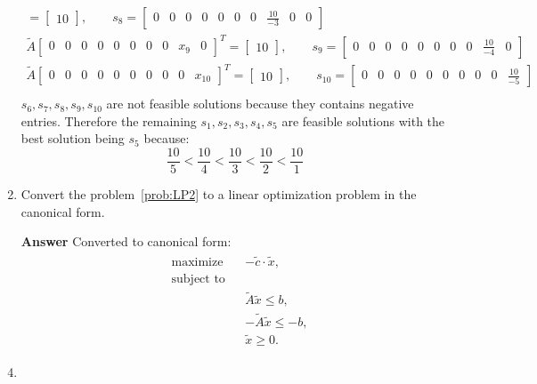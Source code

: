 \documentclass[10pt,a4paper]{article}
\theoremstyle{plain}
\theoremstyle{definition}
\begin{document}
\begin{enumerate}
\begin{align*}
  		=
  		\begin{bmatrix}10\end{bmatrix},\qquad s_8=\begin{bmatrix}
  			0 & 0 & 0 & 0 & 0 & 0 & 0 & \frac{10}{-3} & 0 & 0
  		\end{bmatrix} \\
  		\tilde{A}
  		\begin{bmatrix}
  			0 & 0 & 0 & 0 & 0 & 0 & 0 & 0 & x_9 & 0
  		\end{bmatrix}^T
  		=
  		\begin{bmatrix}10\end{bmatrix},\qquad s_9=\begin{bmatrix}
  			0 & 0 & 0 & 0 & 0 & 0 & 0 & 0 & \frac{10}{-4} & 0
  		\end{bmatrix} \\
  		\tilde{A}
  		\begin{bmatrix}
  			0 & 0 & 0 & 0 & 0 & 0 & 0 & 0 & 0 & x_{10}
  		\end{bmatrix}^T
  		=
  		\begin{bmatrix}10\end{bmatrix},\qquad s_{10}=\begin{bmatrix}
  			0 & 0 & 0 & 0 & 0 & 0 & 0 & 0 & 0 & \frac{10}{-5}
  		\end{bmatrix} \\
  \end{align*}
  $s_6, s_7, s_8, s_9, s_{10}$ are not feasible solutions because they contains negative entries. Therefore the remaining $s_1, s_2, s_3, s_4, s_5$ are feasible solutions with the best solution being $s_5$ because: \[\frac{10}{5} < \frac{10}{4} < \frac{10}{3} < \frac{10}{2} < \frac{10}{1}\]
\item\label{spm:canonic}
Convert the problem~\eqref{prob:LP2} to a linear optimization problem in the canonical form.
\item[\textbf{Answer}] Converted to canonical form:
\begin{align*}
  \begin{aligned}
    &\text{maximize} && -\tilde{c}\cdot \tilde{x},\\
    &\text{subject to}&&\\
    &&&\tilde{A}\tilde{x} \leq b,\\
    &&&-\tilde{A}\tilde{x} \leq -b, \\
    &&& \tilde{x}\geq 0.
  \end{aligned}
\end{align*}
\item\label{spm:dual}

\end{enumerate}
\end{document}

